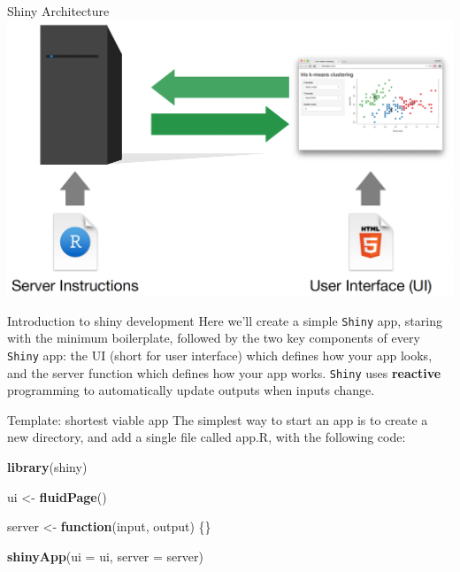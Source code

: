 \documentclass[
  ignorenonframetext,
]{beamer}
\newenvironment{Shaded}{\begin{snugshade}}{\end{snugshade}}
\newcommand{\AttributeTok}[1]{\textcolor[rgb]{0.13,0.29,0.53}{#1}}
\newcommand{\ControlFlowTok}[1]{\textcolor[rgb]{0.13,0.29,0.53}{\textbf{#1}}}
\newcommand{\FunctionTok}[1]{\textcolor[rgb]{0.13,0.29,0.53}{\textbf{#1}}}
\newcommand{\NormalTok}[1]{#1}
\newcommand{\OtherTok}[1]{\textcolor[rgb]{0.56,0.35,0.01}{#1}}
\begin{document}
\begin{frame}{Shiny Architecture}
\label{shiny-architecture-2}
\includegraphics{shinyfigs/shiny_arch_3.png}
\end{frame}

\begin{frame}[fragile]{Introduction to shiny development}
\label{introduction-to-shiny-development}
Here we'll create a simple \texttt{Shiny} app, staring with the minimum
boilerplate, followed by the two key components of every \texttt{Shiny}
app: the UI (short for user interface) which defines how your app looks,
and the server function which defines how your app works. \texttt{Shiny}
uses \textbf{reactive} programming to automatically update outputs when
inputs change.
\end{frame}

\begin{frame}[fragile]{Template: shortest viable app}
\label{template-shortest-viable-app}
The simplest way to start an app is to create a new directory, and add a
single file called app.R, with the following code:

\begin{Shaded}
\begin{Highlighting}[]
\FunctionTok{library}\NormalTok{(shiny)}

\NormalTok{ui }\OtherTok{\textless{}{-}} \FunctionTok{fluidPage}\NormalTok{()}

\NormalTok{server }\OtherTok{\textless{}{-}} \ControlFlowTok{function}\NormalTok{(input, output) \{\}}

\FunctionTok{shinyApp}\NormalTok{(}\AttributeTok{ui =}\NormalTok{ ui, }\AttributeTok{server =}\NormalTok{ server)}
\end{Highlighting}
\end{Shaded}
\end{frame}
\end{document}
